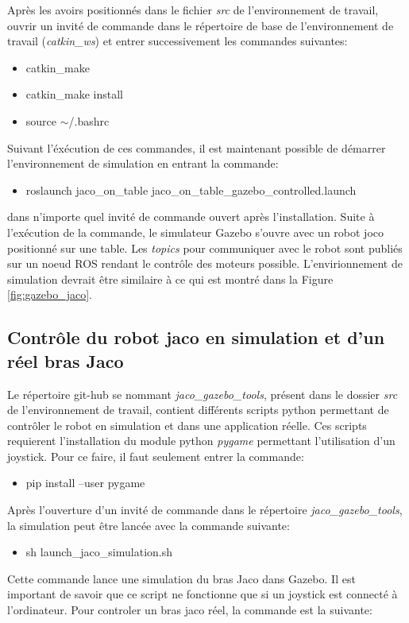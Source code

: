 \documentclass[root.tex]{subfiles}
\begin{document}
Après les avoirs positionnés dans le fichier \textit{src} de l'environnement de travail, ouvrir un invité de commande dans le répertoire de base de l'environnement de travail (\textit{catkin\_ws}) et entrer successivement les commandes suivantes:

\begin{itemize}
\item catkin\_make
\item catkin\_make install
\item source $\sim$/.bashrc
\end{itemize}

Suivant l'éxécution de ces commandes, il est maintenant possible de démarrer l'environnement de simulation en entrant la commande:
\begin{itemize}
\item roslaunch jaco\_on\_table jaco\_on\_table\_gazebo\_controlled.launch
\end{itemize}
dans n'importe quel invité de commande ouvert après l'installation. 
Suite à l'exécution de la commande, le simulateur Gazebo s'ouvre avec un robot joco positionné sur une table.
Les \textit{topics} pour communiquer avec le robot sont publiés sur un noeud ROS rendant le contrôle des moteurs possible.
L'envirionnement de simulation devrait être similaire à ce qui est montré dans la Figure \ref{fig:gazebo_jaco}.

\subsection{Contrôle du robot jaco en simulation et d'un réel bras Jaco}

Le répertoire git-hub se nommant \textit{jaco\_gazebo\_tools}, présent dans le dossier \textit{src} de l'environnement de travail, contient différents scripts python permettant de contrôler le robot en simulation et dans une application réelle.
Ces scripts requierent l'installation du module python \textit{pygame} permettant l'utilisation d'un joystick.
Pour ce faire, il faut seulement entrer la commande:
\begin{itemize}
\item pip install --user pygame
\end{itemize}
Après l'ouverture d'un invité de commande dans le répertoire \textit{jaco\_gazebo\_tools}, la simulation peut être lancée avec la commande suivante:
\begin{itemize}
\item sh launch\_jaco\_simulation.sh
\end{itemize}
Cette commande lance une simulation du bras Jaco dans Gazebo.
Il est important de savoir que ce script ne fonctionne que si un joystick est connecté à l'ordinateur.
Pour controler un bras jaco réel, la commande est la suivante:
\end{document}
